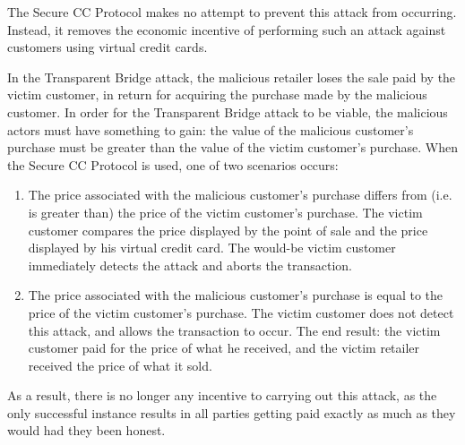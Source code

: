 The Secure CC Protocol makes no attempt to prevent this attack from occurring.
Instead, it removes the economic incentive of performing such an attack against customers using virtual credit cards.

In the Transparent Bridge attack, the malicious retailer loses the sale paid by the victim customer, in return for acquiring the purchase made by the malicious customer.
In order for the Transparent Bridge attack to be viable, the malicious actors must have something to gain:
  the value of the malicious customer's purchase must be greater than the value of the victim customer's purchase.
When the Secure CC Protocol is used, one of two scenarios occurs:

\begin{enumerate}
\item The price associated with the malicious customer's purchase differs from (i.e. is greater than) the price of the victim customer's purchase.
The victim customer compares the price displayed by the point of sale and the price displayed by his virtual credit card.
The would-be victim customer immediately detects the attack and aborts the transaction.
\item The price associated with the malicious customer's purchase is equal to the price of the victim customer's purchase.
The victim customer does not detect this attack, and allows the transaction to occur.
The end result: the victim customer paid for the price of what he received, and the victim retailer received the price of what it sold.
\end{enumerate}

As a result, there is no longer any incentive to carrying out this attack, as the only successful instance results in all parties getting paid exactly as much as they would had they been honest.
